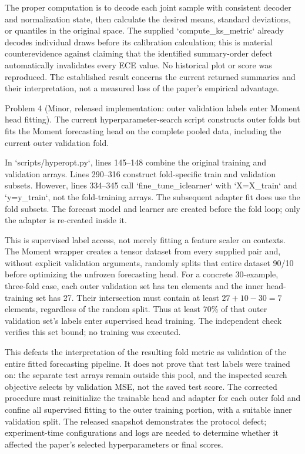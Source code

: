\documentclass[10pt]{article}
\begin{document}
The proper computation is to decode each joint sample with consistent decoder and normalization state, then calculate the desired means, standard deviations, or quantiles in the original space. The supplied `compute\_ks\_metric` already decodes individual draws before its calibration calculation; this is material counterevidence against claiming that the identified summary-order defect automatically invalidates every ECE value. No historical plot or score was reproduced. The established result concerns the current returned summaries and their interpretation, not a measured loss of the paper’s empirical advantage.\par
Problem 4 (Minor, released implementation: outer validation labels enter Moment head fitting).  The current hyperparameter-search script constructs outer folds but fits the Moment forecasting head on the complete pooled data, including the current outer validation fold.\par
In `scripts/hyperopt.py`, lines 145–148 combine the original training and validation arrays. Lines 290–316 construct fold-specific train and validation subsets. However, lines 334–345 call `fine\_tune\_iclearner` with `X=X\_train` and `y=y\_train`, not the fold-training arrays. The subsequent adapter fit does use the fold subsets. The forecast model and learner are created before the fold loop; only the adapter is re-created inside it.\par
This is supervised label access, not merely fitting a feature scaler on contexts. The Moment wrapper creates a tensor dataset from every supplied pair and, without explicit validation arguments, randomly splits that entire dataset 90/10 before optimizing the unfrozen forecasting head. For a concrete 30-example, three-fold case, each outer validation set has ten elements and the inner head-training set has 27. Their intersection must contain at least \(27+10-30=7\) elements, regardless of the random split. Thus at least 70\% of that outer validation set’s labels enter supervised head training. The independent check verifies this set bound; no training was executed.\par
This defeats the interpretation of the resulting fold metric as validation of the entire fitted forecasting pipeline. It does not prove that test labels were trained on: the separate test arrays remain outside this pool, and the inspected search objective selects by validation MSE, not the saved test score. The corrected procedure must reinitialize the trainable head and adapter for each outer fold and confine all supervised fitting to the outer training portion, with a suitable inner validation split. The released snapshot demonstrates the protocol defect; experiment-time configurations and logs are needed to determine whether it affected the paper’s selected hyperparameters or final scores.\par
\end{document}
